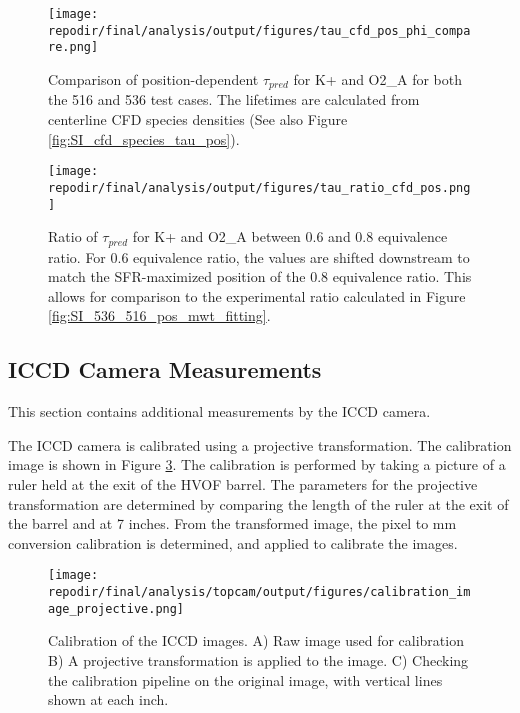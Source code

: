 
\begin{figure}[]
\centering
\texttt{[image: \\repodir/final/analysis/output/figures/tau\_cfd\_pos\_phi\_compare.png]}
\caption{Comparison of position-dependent $\tau_{pred}$ for K+ and O2\_A for both the 516 and 536 test cases. The lifetimes are calculated from centerline CFD species densities (See also Figure \ref{fig:SI_cfd_species_tau_pos}).}
\label{fig:SI_tau_cfd_pos_phi_compare}
\end{figure}



\begin{figure}[]
\centering
\texttt{[image: \\repodir/final/analysis/output/figures/tau\_ratio\_cfd\_pos.png]}
\caption{Ratio of $\tau_{pred}$ for K+ and O2\_A between 0.6 and 0.8 equivalence ratio. For 0.6 equivalence ratio, the values are shifted downstream to match the SFR-maximized position of the 0.8 equivalence ratio. This allows for comparison to the experimental ratio calculated in Figure \ref{fig:SI_536_516_pos_mwt_fitting}.}
\label{fig:SI_tau_ratio_cfd_pos}
\end{figure}

\clearpage
\subsection{ICCD Camera Measurements}

This section contains additional measurements by the ICCD camera. 

The ICCD camera is calibrated using a projective transformation. The calibration image is shown in Figure \ref{fig:SI_iccd_calibration}. The calibration is performed by taking a picture of a ruler held at the exit of the HVOF barrel. The parameters for the projective transformation are determined by comparing the length of the ruler at the exit of the barrel and at 7 inches. From the transformed image, the pixel to mm conversion calibration is determined, and applied to calibrate the images. 

\begin{figure}[]
\centering
\texttt{[image: \\repodir/final/analysis/topcam/output/figures/calibration\_image\_projective.png]}
\caption{Calibration of the ICCD images. A) Raw image used for calibration B) A projective transformation is applied to the image. C) Checking the calibration pipeline on the original image, with vertical lines shown at each inch.}
\label{fig:SI_iccd_calibration}
\end{figure}

